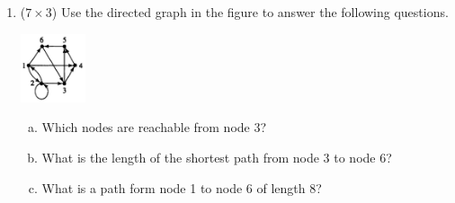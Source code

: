 \documentclass[12pt]{article}
\begin{document}
\begin{enumerate}
	
		\newpage
		\item ($7 \times 3$)
		Use the directed graph in the figure to answer the following questions.
		\begin{center}
			\includegraphics[width=0.15\textwidth]{HW10-2}
		\end{center}
		\begin{enumerate}[a.]
			\item 
			Which nodes are reachable from node 3?
			\item
			What is the length of the shortest path from node 3 to node 6?
			\item
			What is a path form node 1 to node 6 of length 8?
		\end{enumerate}
		

		

		

		
	\end{enumerate}
\end{document}
